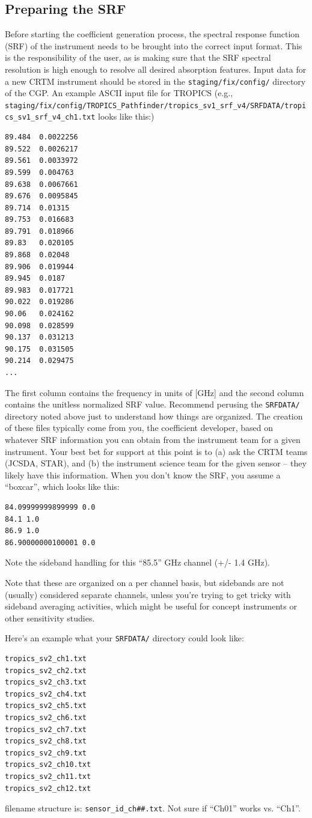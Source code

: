 \subsection{Preparing the SRF}
Before starting the coefficient generation process, the spectral response function (SRF) of the instrument needs to be brought into the correct input format. 
This is the responsibility of the user, as is making sure that the SRF spectral resolution is high enough to resolve all desired absorption features.
Input data for a new CRTM instrument should be stored in the \verb|staging/fix/config/| directory of the CGP.
An example ASCII input file for TROPICS (e.g., \verb|staging/fix/config/TROPICS_Pathfinder/tropics_sv1_srf_v4/SRFDATA/tropics_sv1_srf_v4_ch1.txt| looks like this:)
\begin{verbatim}
89.484  0.0022256
89.522  0.0026217
89.561  0.0033972
89.599  0.004763
89.638  0.0067661
89.676  0.0095845
89.714  0.01315
89.753  0.016683
89.791  0.018966
89.83   0.020105
89.868  0.02048
89.906  0.019944
89.945  0.0187
89.983  0.017721
90.022  0.019286
90.06   0.024162
90.098  0.028599
90.137  0.031213
90.175  0.031505
90.214  0.029475
...
\end{verbatim}
The first column contains the frequency in units of [GHz] and the second column contains the unitless normalized SRF value.
Recommend perusing the \verb|SRFDATA/| directory noted above just to understand how things are organized.   The creation of these files typically come from you, the coefficient developer, based on whatever SRF information you can obtain from the instrument team for a given instrument.  Your best bet for support at this point is to (a) ask the CRTM teams (JCSDA, STAR), and (b) the instrument science team for the given sensor -- they likely have this information.    When you don't know the SRF, you assume a ``boxcar'', which looks like this:
\begin{verbatim}
84.09999999899999 0.0
84.1 1.0
86.9 1.0
86.90000000100001 0.0
\end{verbatim}
Note the sideband handling for this ``85.5'' GHz channel (+/- 1.4 GHz).  

Note that these are organized on a per channel basis, but sidebands are not (usually) considered separate channels, unless you're trying to get tricky with sideband averaging activities, which might be useful for concept instruments or other sensitivity studies. 

Here's an example what your \verb|SRFDATA/| directory could look like:
\begin{verbatim}
tropics_sv2_ch1.txt
tropics_sv2_ch2.txt
tropics_sv2_ch3.txt
tropics_sv2_ch4.txt
tropics_sv2_ch5.txt
tropics_sv2_ch6.txt
tropics_sv2_ch7.txt
tropics_sv2_ch8.txt
tropics_sv2_ch9.txt
tropics_sv2_ch10.txt
tropics_sv2_ch11.txt
tropics_sv2_ch12.txt
\end{verbatim}
filename structure is: \verb|sensor_id_ch##.txt|.  Not sure if ``Ch01'' works vs. ``Ch1''.  

